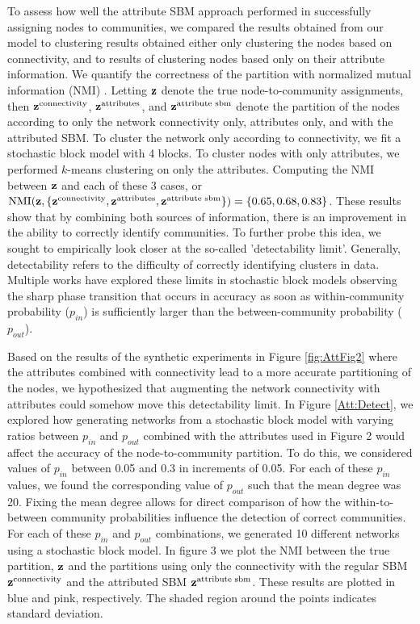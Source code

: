 \indent To assess how well the attribute SBM approach performed in successfully assigning nodes to communities, we compared the results obtained from our model to clustering results obtained either only clustering the nodes based on connectivity, and to results of clustering nodes based only on their attribute information. We quantify the correctness of the partition with normalized mutual information (NMI) \cite{commdeccompare}. Letting ${\bf z}$ denote the true node-to-community assignments, then ${\bf z}^{\text{connectivity}}$, ${\bf z}^{\text{attributes}}$, and ${\bf z}^{\text{attribute sbm}}$ denote the partition of the nodes according to only the network connectivity only, attributes only, and with the attributed SBM. To cluster the network only according to connectivity, we fit a stochastic block model with 4 blocks. To cluster nodes with only attributes, we performed $k$-means clustering on only the attributes. Computing the NMI between ${\bf z}$ and each of these 3 cases, or $\text{NMI}({\bf z},\{{\bf z}^{\text{connectivity}}, {\bf z}^{\text{attributes}},{\bf z}^{\text{attribute sbm}}\})=\{0.65,0.68,0.83\}$. These results show that by combining both sources of information, there is an improvement in the ability to correctly identify communities. To further probe this idea, we sought to empirically look closer at the so-called 'detectability limit'. Generally, detectability refers to the difficulty of correctly identifying clusters in data. Multiple works \cite{decelle2011inference,taylor2015enhanced} have explored these limits in stochastic block models observing the sharp phase transition that occurs in accuracy as soon as within-community probability ($p_{in}$)  is sufficiently larger than the between-community probability ($p_{out}$). 

\indent Based on the results of the synthetic experiments in Figure \ref{fig:AttFig2} where the attributes combined with connectivity lead to a more accurate partitioning of the nodes, we hypothesized that augmenting the network connectivity with attributes could somehow move this detectability limit. In Figure \ref{Att:Detect}, we explored how generating networks from a stochastic block model with varying ratios between $p_{in}$ and $p_{out}$ combined with the attributes used in Figure 2 would affect the accuracy of the node-to-community partition. To do this, we considered values of $p_{in}$ between 0.05 and 0.3 in increments of 0.05. For each of these $p_{in}$ values, we found the corresponding value of $p_{out}$ such that the mean degree was 20. Fixing the mean degree allows for direct comparison of how the within-to-between community probabilities influence the detection of correct communities. For each of these $p_{in}$ and $p_{out}$ combinations, we generated 10 different networks using a stochastic block model. In figure 3 we plot the NMI between the true partition, ${\bf z}$ and the partitions using only the connectivity with the regular SBM ${\bf z}^{\text{connectivity}}$ and the attributed SBM ${\bf z}^{\text{attribute sbm}}$. These results are plotted in blue and pink, respectively. The shaded region around the points indicates standard deviation. 

